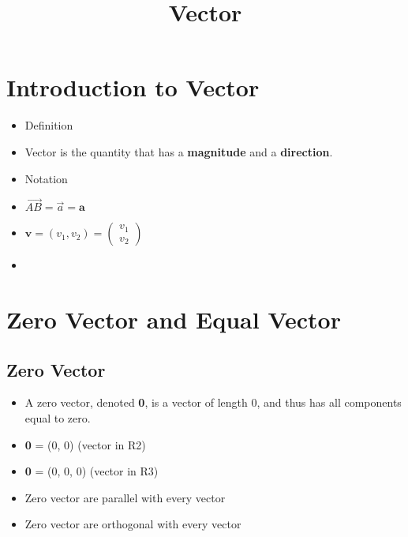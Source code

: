 \documentclass[a4paper,12pt]{article}
\begin{document}
\title{Vector}

\section*{Introduction to Vector}
\begin{itemize}
  \item Definition
  \item[] Vector is the quantity that has a \textbf{magnitude} and a \textbf{direction}.
  \item Notation
  \item[] $\overrightarrow{AB} = \overrightarrow{a} = \textbf{a} $
  \item[] $\textbf{v} = (v_1, v_2) = \begin{pmatrix} v_1 \\ v_2 \end{pmatrix} $
  \item[] 
\end{itemize}

\section*{Zero Vector and Equal Vector}

\subsection*{Zero Vector}
\begin{itemize}
  \item A zero vector, denoted \textbf{0}, is a vector of length 0, and thus has all components equal to zero.
  \item[] \textbf{0} = (0, 0) (vector in R2)
  \item[] \textbf{0} = (0, 0, 0) (vector in R3)
  \item Zero vector are parallel with every vector
  \item Zero vector are orthogonal with every vector
\end{itemize}
\end{document}
